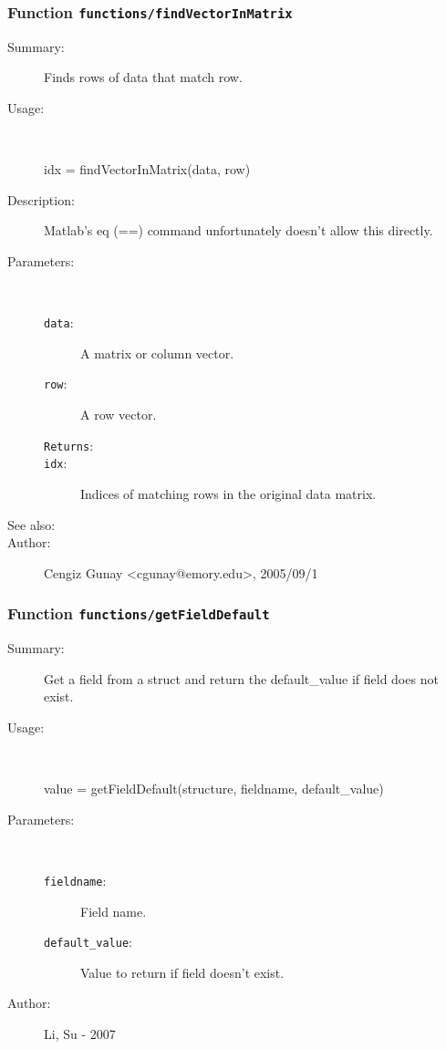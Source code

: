 \subsubsection[Function \texttt{findVectorInMatrix}]{Function \texttt{functions/findVectorInMatrix}}%
%
\label{ref_functions__findVectorInMatrix}%
\hypertarget{ref_functions__findVectorInMatrix}{}%
\begin{description}
\item[Summary:]Finds rows of data that match row.
%
\item[Usage:]~%
\begin{lyxcode}%
idx = findVectorInMatrix(data, row)
%
\end{lyxcode}%
%
\item[Description:]%
Matlab's eq (==) command unfortunately doesn't allow this directly.
\item[Parameters:]~
\begin{description}%
\item[\texttt{data}:]
 A matrix or column vector.
\item[\texttt{row}:]
 A row vector.
\item[\texttt{Returns}:]

\item[\texttt{idx}:]
 Indices of matching rows in the original data matrix.
\end{description}%
%
%
%
\item[See also:]%
%
\item[Author:]%
Cengiz Gunay <cgunay@emory.edu>, 2005/09/1
%
\end{description}
\methodline%
\subsubsection[Function \texttt{getFieldDefault}]{Function \texttt{functions/getFieldDefault}}%
%
\label{ref_functions__getFieldDefault}%
\hypertarget{ref_functions__getFieldDefault}{}%
\begin{description}
\item[Summary:]Get a field from a struct and return the default\_value if field does not exist.
%
\item[Usage:]~%
\begin{lyxcode}%
value = getFieldDefault(structure, fieldname, default\_value)
%
\end{lyxcode}%
%
%
\item[Parameters:]~
\begin{description}%
\item[\texttt{fieldname}:]
 Field name.
\item[\texttt{default\_value}:]
 Value to return if field doesn't exist.
\end{description}%
%
%
%
%
\item[Author:]%
Li, Su - 2007
%
\end{description}
\methodline%
